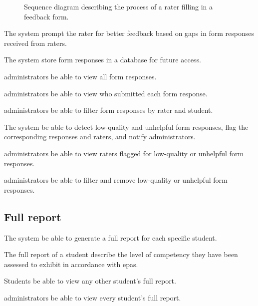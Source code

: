 \documentclass[letterpaper,article,oneside]{memoir}
\begin{document}
\begin{figure}
  \centering
  
  \caption{Sequence diagram describing the process of a rater filling in a feedback form.}
  \label{fig:response-prompt-sd}
\end{figure}

\begin{requirements}
   The system  prompt the \gls{rater} for better feedback based on gaps in \glspl{form response} received from \glspl{rater}.
   \dep{\ref{req:ff1}}

   The system  store \glspl{form response} in a database for future access.
   \dep{\ref{req:ff2}}

   \Glspl{administrator}  be able to view all \glspl{form response}.
   \dep{\ref{req:qc2}}
  
   \Glspl{administrator}  be able to view who submitted each \gls{form response}.
   \dep{\ref{req:qc3}}

   \Glspl{administrator}  be able to filter \glspl{form response} by \gls{rater} and \gls{student}.
   \dep{\ref{req:qc4}}

   The system  be able to detect low-quality and unhelpful \glspl{form response}, flag the corresponding responses and \glspl{rater}, and notify \glspl{administrator}.
   \dep{\ref{req:qc2}}

   \Glspl{administrator}  be able to view \glspl{rater} flagged for low-quality or unhelpful \glspl{form response}.
   \dep{\ref{req:qc5}}

   \Glspl{administrator}  be able to filter and remove low-quality or unhelpful \glspl{form response}.
   \dep{\ref{req:qc6}}
\end{requirements}

\subsection{Full report}

\begin{requirements}
   The system  be able to generate a \gls{full report} for each specific \gls{student}.
   \dep{\ref{req:qc2}}

   The \gls{full report} of a student  describe the level of \gls{competency} they have been assessed to exhibit in accordance with \glspl{epa}.
   \dep{\ref{req:fr1}}

   Students  be able to view any other \gls{student}'s \gls{full report}.
   \dep{\ref{req:fr1}}

   \Glspl{administrator}  be able to view every \gls{student}'s \gls{full report}.
   \dep{\ref{req:fr1}}
\end{requirements}
\end{document}
